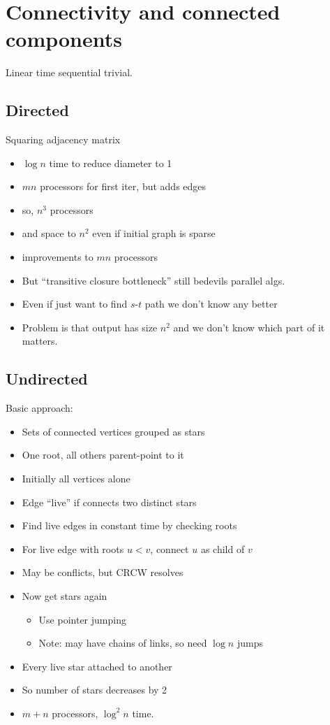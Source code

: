 \documentclass[12pt]{article}
\begin{document}
\section*{Connectivity and connected components}

Linear time sequential trivial.

\subsection*{Directed}

Squaring adjacency matrix
\begin{itemize}
\item $\log n$ time to reduce diameter to 1
\item $mn$ processors for first iter, but adds edges
\item so, $n^3$ processors
\item and space to $n^2$ even if initial graph is sparse
\item improvements to $mn$ processors
\item But ``transitive closure bottleneck'' still bedevils parallel
  algs.
\item Even if just want to find $s$-$t$ path we don't know any better
\item Problem is that output has size $n^2$ and we don't know which
  part of it matters.
\end{itemize}

\subsection*{Undirected}

Basic approach:
\begin{itemize}
\item Sets of connected vertices grouped as stars
\item One root, all others parent-point to it
\item Initially all vertices alone
\item Edge ``live'' if connects two distinct stars
\item Find live edges in constant time by checking roots
\item For live edge with roots $u<v$, connect $u$ as child of $v$
\item May be conflicts, but CRCW resolves
\item Now get stars again
\begin{itemize}
\item Use pointer jumping
\item Note: may have chains of links, so need $\log n$ jumps
\end{itemize}
\item Every live star attached to another
\item So number of stars decreases by 2
\item $m+n$ processors, $\log^2 n$ time.
\end{itemize}
\end{document}
